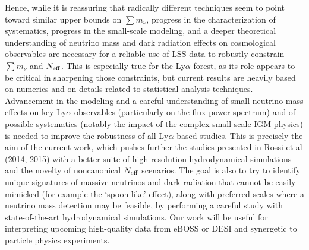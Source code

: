 \documentclass{emulateapj}
\begin{document}
Hence, while it is  reassuring that radically different techniques seem to  
point toward similar upper bounds on $\sum m_{\nu}$, progress in 
the characterization of systematics, progress in the small-scale modeling, and a deeper theoretical understanding of 
neutrino mass and dark radiation effects on cosmological observables 
are necessary for a reliable use of LSS data to robustly constrain $\sum m_{\nu}$ and $N_{\rm eff}$.
This is especially true for the Ly$\alpha$ forest, as its role appears to be critical in sharpening those 
constraints, but current results are heavily based on numerics and on details related to statistical analysis techniques. 
 Advancement in the modeling and a careful understanding of small neutrino mass effects on key Ly$\alpha$ observables (particularly on the flux power spectrum) 
and of possible systematics (notably the impact of the complex small-scale IGM physics)  is needed to improve the robustness of all Ly$\alpha$-based studies. 
This is precisely the aim of the current work, which
pushes further the studies presented in Rossi et al (2014, 2015) with a better suite of high-resolution hydrodynamical simulations 
and the novelty of noncanonical $N_{\rm eff}$ scenarios.  The goal is also to try to identify unique signatures of massive neutrinos and dark radiation that cannot be easily mimicked 
(for example the `spoon-like' effect),  along with preferred scales where a 
neutrino mass detection may be feasible, by performing a careful study with state-of-the-art hydrodynamical simulations. 
Our work will be useful for interpreting upcoming high-quality data from  eBOSS or DESI and synergetic to particle physics experiments.  
 
 
\end{document}
